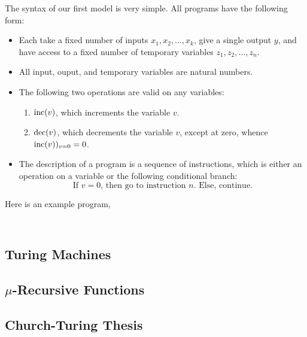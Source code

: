 \documentclass[english, 12pt]{article}
\begin{document}
  The syntax of our first model is very simple. All programs have the 
  following form: 
  \begin{itemize}
      \item Each take a fixed number of inputs $x_1, x_2, \dots, x_k$,
            give a single output $y$, and have access to a fixed number
            of temporary variables $z_1, z_2, \dots, z_n$. 
      \item All input, ouput, and temporary variables are natural numbers.
      \item The following two operations are valid on any variables:
          \begin{enumerate}
              \item $\text{inc}(v)$, which increments the variable $v$.
              \item $\text{dec}(v)$, which decrements the variable $v$, except at zero, 
                whence $\text{inc}(v))_{v=0} = 0$.
          \end{enumerate}
      \item The description of a program is a sequence of instructions,
            which is either an operation on a variable or the following
            conditional branch:
            \[ \text{If } v = 0 \text{, then go to instruction } n
            \text{. Else, continue.} \]
  \end{itemize}
  Here is an example program,
  \begin{lstlisting}
  
  \end{lstlisting}
  \subsection{Turing Machines}
  \subsection{$\mu$-Recursive Functions}
  \subsection{Church-Turing Thesis}
  
\end{document}
